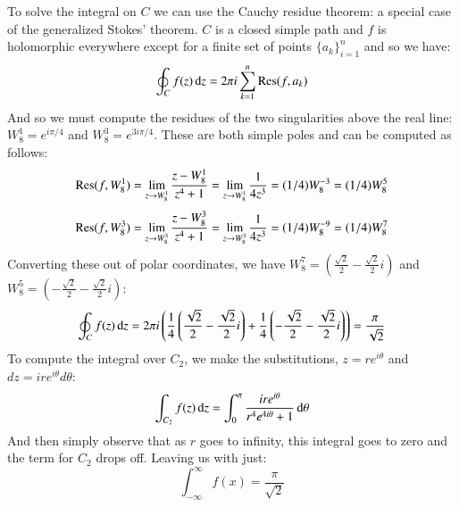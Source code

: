 To solve the integral on $C$ we can use the Cauchy residue theorem: a special case of the generalized Stokes' theorem.
$C$ is a closed simple path and $f$ is holomorphic everywhere except for a finite set of points $\{a_k\}_{i=1}^n$
and so we have:
\begin{equation}
	\oint_C f(z) \mathop{}\!\mathrm{d} z = 2 \pi i \sum_{k=1}^n \text{Res}(f, a_k)
\end{equation}
And so we must compute the residues of the two singularities above the real line: 
$W_8^1 = e^{i\pi/4}$ and $W_8^3 = e^{3i\pi/4}$.
These are both simple poles and can be computed as follows:
\begin{equation*}
	\text{Res}(f, W_8^1) =\lim_{z \to W_8^1} \frac{z - W_8^1}{z^4 +1} 
		= \lim_{z \to W_8^1} \frac{1}{4z^3}
		= (1/4) W_8^{-3} = (1/4) W_8^5
\end{equation*}
\begin{equation*}
	\text{Res}(f, W_8^3) =\lim_{z \to W_8^3} \frac{z - W_8^3}{z^4 +1} 
		= \lim_{z \to W_8^3} \frac{1}{4z^3}
		= (1/4) W_8^{-9} = (1/4) W_8^7
\end{equation*}
Converting these out of polar coordinates, we have 
	$W_8^7 = \left( \frac{\sqrt{2}}{2}-\frac{\sqrt{2}}{2}i \right)$ 
	and $W_8^5 =\left( -\frac{\sqrt{2}}{2}-\frac{\sqrt{2}}{2}i \right)$:
\begin{equation*}
	\oint_C f(z) \mathop{}\!\mathrm{d} z 
	= 2 \pi i \left( 	\frac{1}{4} \left( \frac{\sqrt{2}}{2}-\frac{\sqrt{2}}{2}i \right) 
				+	\frac{1}{4} \left( -\frac{\sqrt{2}}{2}-\frac{\sqrt{2}}{2}i \right)\right)
	= \frac{\pi}{\sqrt{2}}
\end{equation*}
To compute the integral over $C_2$, we make the substitutions, $z = re^{i \theta}$ and $dz=ire^{i\theta} d\theta$:
\begin{equation*}
	\int_{C_2} f(z) \mathop{}\!\mathrm{d} z = \int_0^\pi \frac{ire^{i\theta}}{r^4 e^{4i\theta} +1} \mathop{}\!\mathrm{d}\theta
\end{equation*}
And then simply observe that as $r$ goes to infinity, this integral goes to zero and the term for $C_2$ drops off.
Leaving us with just:
\begin{equation*}
	\int_{-\infty}^\infty f(x) = \frac{\pi }{\sqrt{2}}
\end{equation*}

